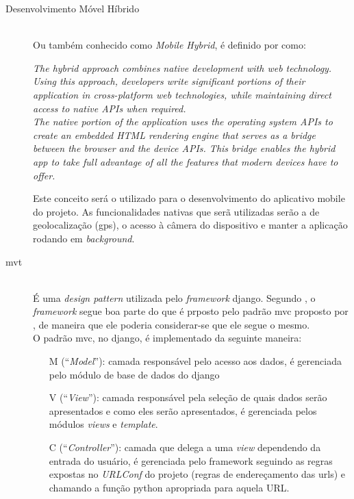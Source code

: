\begin{description}
%
    \item[Desenvolvimento Móvel Híbrido] \hfill \\
        Ou também conhecido como \textit{Mobile Hybrid}, é definido por  como:
        \begin{citacao}
            \textit{The hybrid approach combines native development with web technology. Using this approach, developers write significant portions of their application in cross-platform web technologies, while maintaining direct access to native APIs when required.}\\
        \textit{The native portion of the application uses the operating system APIs to create an embedded HTML rendering engine that serves as a bridge between the browser and the device APIs. This bridge enables the hybrid app to take full advantage of all the features that modern devices have to offer.}
        \end{citacao}
        Este conceito será o utilizado para o desenvolvimento do aplicativo mobile do projeto. As funcionalidades nativas que serã utilizadas serão a de geolocalização (gps), o acesso à câmera do dispositivo e manter a aplicação rodando em \textit{background}.%
\clearpage
    \item[\gls{mvt}] \hfill \\
        É uma \textit{design pattern} utilizada pelo \textit{framework} \gls{django}. Segundo , o \textit{framework} segue boa parte do que é prposto pelo padrão \gls{mvc} proposto por , de maneira que ele poderia considerar-se que ele segue o mesmo.\\
        O padrão \gls{mvc}, no \gls{django}, é implementado da seguinte maneira:
        \begin{itemize}
	        \item[M](``\textit{Model}''): camada responsável pelo acesso aos dados, é gerenciada pelo módulo de base de dados do \gls{django}
	        \item[V](``\textit{View}''): camada responsável pela seleção de quais dados serão apresentados e como eles serão apresentados, é gerenciada pelos módulos \textit{views} e \textit{template}.
	        \item[C](``\textit{Controller}''): camada que delega a uma \textit{view} dependendo da entrada do usuário, é gerenciada pelo framework seguindo as regras expostas no \textit{URLConf} do projeto (regras de endereçamento das urls) e chamando a função python apropriada para aquela URL.

\end{itemize}
\end{description}
